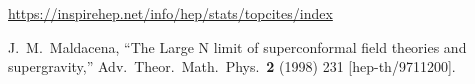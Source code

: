 \begin{thebibliography}{99}

%
%

\url{https://inspirehep.net/info/hep/stats/topcites/index}

  J.~M.~Maldacena,
  ``The Large N limit of superconformal field theories and supergravity,''
  Adv.\ Theor.\ Math.\ Phys.\  {\bf 2 } (1998)  231
  [hep-th/9711200].

\end{thebibliography}
